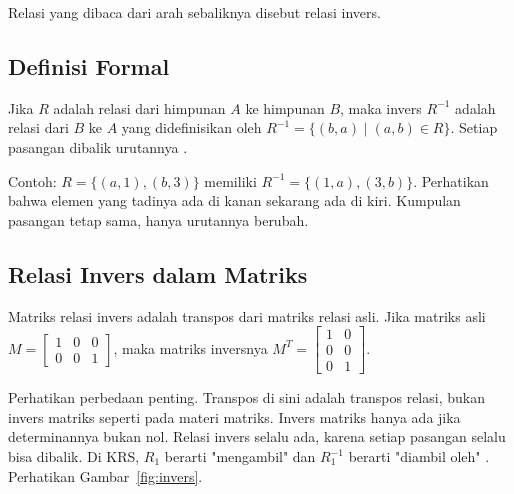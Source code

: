 \documentclass[11pt,a4paper]{article}
\begin{document}
Relasi yang dibaca dari arah sebaliknya disebut relasi invers.

\subsection{Definisi Formal}

Jika $R$ adalah relasi dari himpunan $A$ ke himpunan $B$, maka invers $R^{-1}$ adalah relasi dari $B$ ke $A$ yang didefinisikan oleh $R^{-1}=\{(b,a) \mid (a,b) \in R\}$. Setiap pasangan dibalik urutannya \cite{rosen}.

Contoh: $R=\{(a,1),(b,3)\}$ memiliki $R^{-1}=\{(1,a),(3,b)\}$. Perhatikan bahwa elemen yang tadinya ada di kanan sekarang ada di kiri. Kumpulan pasangan tetap sama, hanya urutannya berubah.

\subsection{Relasi Invers dalam Matriks}

Matriks relasi invers adalah transpos dari matriks relasi asli. Jika matriks asli $M=\begin{bmatrix}1&0&0\\0&0&1\end{bmatrix}$, maka matriks inversnya $M^T=\begin{bmatrix}1&0\\0&0\\0&1\end{bmatrix}$.

Perhatikan perbedaan penting. Transpos di sini adalah transpos relasi, bukan invers matriks seperti pada materi matriks. Invers matriks hanya ada jika determinannya bukan nol. Relasi invers selalu ada, karena setiap pasangan selalu bisa dibalik. Di KRS, $R_1$ berarti "mengambil" dan $R_1^{-1}$ berarti "diambil oleh" \cite{silberschatz}. Perhatikan Gambar~\ref{fig:invers}.
\end{document}
